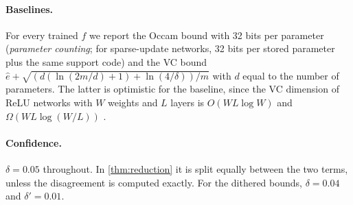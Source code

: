 \paragraph{Baselines.} For every trained $f$ we report the Occam bound with 32 bits per parameter (\emph{parameter counting}; for sparse-update networks, 32 bits per stored parameter plus the same support code) and the VC bound $\hat e+\sqrt{(d(\ln(2m/d)+1)+\ln(4/\delta))/m}$ with $d$ equal to the number of parameters. The latter is optimistic for the baseline, since the VC dimension of ReLU networks with $W$ weights and $L$ layers is $O(WL\log W)$ and $\Omega(WL\log(W/L))$ \cite{bartlett2019nearly}.

\paragraph{Confidence.} $\delta=0.05$ throughout. In \cref{thm:reduction} it is split equally between the two terms, unless the disagreement is computed exactly. For the dithered bounds, $\delta=0.04$ and $\delta'=0.01$.
